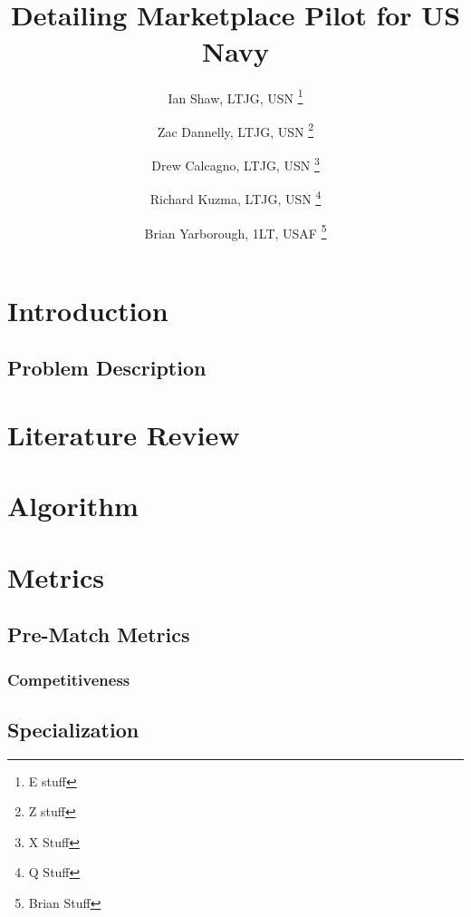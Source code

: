 \documentclass{article}
\title{\projectname \\ \large Detailing Marketplace Pilot for US Navy}
\author{Ian Shaw, LTJG, USN \thanks{E stuff} 
\and Zac Dannelly, LTJG, USN \thanks{Z stuff}
\and Drew Calcagno, LTJG, USN \thanks{X Stuff} 
\and Richard Kuzma, LTJG, USN \thanks{Q Stuff} 
\and Brian Yarborough, 1LT, USAF \thanks{Brian Stuff}}
\begin{document}
\maketitle

\begin{abstract}

\end{abstract}

\newpage

\tableofcontents

\newpage

\section{Introduction}



\subsection{Problem Description}



\section{Literature Review}



\section{Algorithm}



\section{Metrics}

\subsection{Pre-Match Metrics}

\subsubsection{Competitiveness}



\subsection{Specialization}
\end{document}
